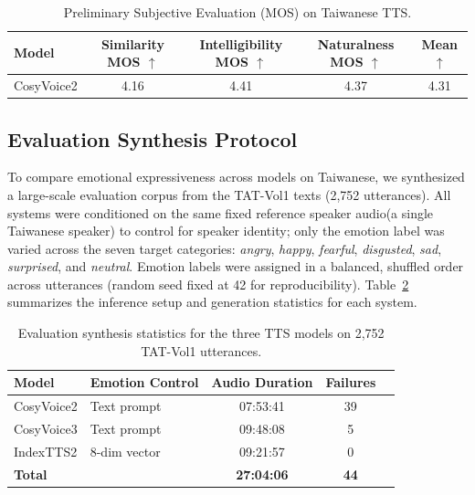 \begin{table}[htbp]
\centering
\caption{Preliminary Subjective Evaluation (MOS) on Taiwanese TTS.}
\label{tab:taiwanese_mos}
\begin{tabular}{lcccc}
\toprule
\textbf{Model} & \textbf{Similarity MOS $\uparrow$} & \textbf{Intelligibility MOS $\uparrow$} & \textbf{Naturalness MOS $\uparrow$} & \textbf{Mean $\uparrow$} \\
\midrule
CosyVoice2 & 4.16 & 4.41 & 4.37 & 4.31 \\
\bottomrule
\end{tabular}
\end{table}

\subsection{Evaluation Synthesis Protocol}
\label{section:exp:synthesis}
To compare emotional expressiveness across models on Taiwanese, we synthesized a large-scale evaluation corpus from the TAT-Vol1 texts (2,752 utterances). All systems were conditioned on the same fixed reference speaker audio(a single Taiwanese speaker) to control for speaker identity; only the emotion label was varied across the seven target categories: \textit{angry}, \textit{happy}, \textit{fearful}, \textit{disgusted}, \textit{sad}, \textit{surprised}, and \textit{neutral}. Emotion labels were assigned in a balanced, shuffled order across utterances (random seed fixed at 42 for reproducibility). Table~\ref{tab:synthesis_stats} summarizes the inference setup and generation statistics for each system.

\begin{table}[htbp]
\centering
\small
\caption{Evaluation synthesis statistics for the three TTS models on 2,752 TAT-Vol1 utterances.}
\label{tab:synthesis_stats}
\begin{tabular}{llccc}
\toprule
\textbf{Model} & \textbf{Emotion Control} & \textbf{Audio Duration} & \textbf{Failures} \\
\midrule
CosyVoice2   & Text prompt   & 07:53:41 & 39 \\
CosyVoice3   & Text prompt   & 09:48:08 & 5  \\
IndexTTS2    & 8-dim vector  & 09:21:57 & 0  \\
\midrule
\textbf{Total} & & \textbf{27:04:06} & \textbf{44} \\
\bottomrule
\end{tabular}
\end{table}

